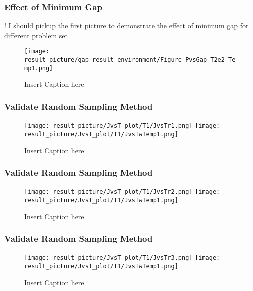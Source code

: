 \documentclass{beamer}
\begin{document}
\begin{frame}
	\frametitle{Effect of Minimum Gap}
	! I should pickup the first picture to demonstrate the effect of minimum gap for different problem set
	\begin{figure}
		\centering
		\texttt{[image: result\_picture/gap\_result\_environment/Figure\_PvsGap\_T2e2\_Temp1.png]}
		
		\caption{Insert Caption here}
	\end{figure}
\end{frame}

\begin{frame}
	\frametitle{Validate Random Sampling Method}
	\begin{figure}
		\centering
		\texttt{[image: result\_picture/JvsT\_plot/T1/JvsTr1.png]}
		\hfill
		\texttt{[image: result\_picture/JvsT\_plot/T1/JvsTwTemp1.png]}		
		
		\caption{Insert Caption here}
	\end{figure}
\end{frame}

\begin{frame}
	\frametitle{Validate Random Sampling Method}
	\begin{figure}
		\centering
		\texttt{[image: result\_picture/JvsT\_plot/T1/JvsTr2.png]}
		\hfill
		\texttt{[image: result\_picture/JvsT\_plot/T1/JvsTwTemp1.png]}		
		
		\caption{Insert Caption here}
	\end{figure}
\end{frame}


\begin{frame}
	\frametitle{Validate Random Sampling Method}
	\begin{figure}
		\centering
		\texttt{[image: result\_picture/JvsT\_plot/T1/JvsTr3.png]}
		\hfill
		\texttt{[image: result\_picture/JvsT\_plot/T1/JvsTwTemp1.png]}		
		
		\caption{Insert Caption here}
	\end{figure}
\end{frame}
\end{document}
